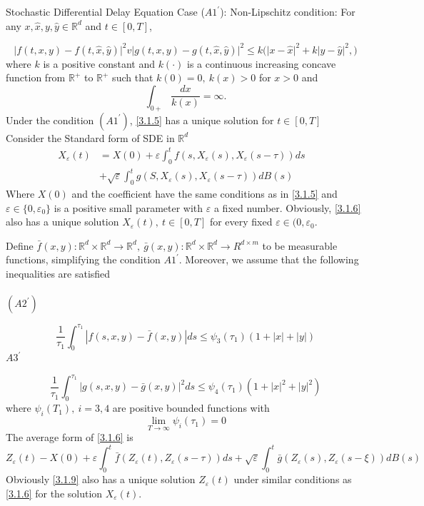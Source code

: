 \documentclass[unknownkeysallowed, compress]{beamer}
\theoremstyle{plain}
\begin{document}
\begin{frame}[allowframebreaks]{Stochastic Differential Delay Equation Case}
($A1^\prime$): Non-Lipschitz condition: For any $x,\hat{x},y,\hat{y}\in\mathbb{R}^d$ and $t\in[0,T]$,

$$
\bigg|f(t,x,y) - f(t,\hat{x},\hat{y})\bigg|^2v\bigg|g(t,x,y) - g(t,\hat{x},\hat{y})\bigg|^2\leq k\bigg(\bigg|x-\hat{x}\bigg|^2+k\bigg|y-\hat{y}\bigg|^2,\bigg)
$$
where $k$ is a positive constant and $k(\cdot)$ is a continuous increasing concave function from $\mathbb{R}^+$ to $\mathbb{R}^+$ such that $k(0) = 0, ~k(x)>0$ for $x>0$ and 
$$
\int_{0+}\frac{dx}{k(x)} = \infty.
$$
Under the condition $(A1^\prime)$, \eqref{3.1.5} has a unique solution for $t\in[0,T]$\\
Consider the Standard form of SDE in $\mathbb{R}^d$
\begin{equation}\label{3.1.6}
\begin{split}
X_\varepsilon(t) & = X(0)+\varepsilon\int_0^tf(s,X_\varepsilon(s),X_\varepsilon(s-\tau))ds&\\
&+\sqrt{\varepsilon}\int_0^tg(S,X_\varepsilon(s),X_\varepsilon(s-\tau))dB(s)
\end{split}
\end{equation}
Where $X(0)$ and the coefficient have the same conditions as in \eqref{3.1.5} and $\varepsilon\in\{0,\varepsilon_0\}$ is a positive small parameter with $\varepsilon$ a fixed number. Obviously, \eqref{3.1.6} also has a unique solution $X_\varepsilon(t),~t\in[0,T]$ for every fixed $\varepsilon\in(0,\varepsilon_0$.\\
\par Define $\bar{f}(x,y):\mathbb{R}^d\times \mathbb{R}^d\rightarrow \mathbb{R}^d,~\bar{g}(x,y):\mathbb{R}^d\times\mathbb{R}^d\rightarrow R^{d\times m}$ to be measurable functions, simplifying the condition $A1^\prime$. Moreover, we assume that the following inequalities are satisfied\\\\
$(A2^\prime)$

\begin{equation}\label{3.1.7}
\frac{1}{\tau_1}\int_0^{\tau_1}|f(s,x,y) - \bar{f}(x,y)|ds\leq \psi_3(\tau_1)(1+|x|+|y|)
\end{equation}
$A3^\prime$

\begin{equation}\label{3.1.8}
\frac{1}{\tau_1}\int_0^{\tau_1}|g(s,x,y) - \bar{g}(x,y)|^2ds\leq \psi_4(\tau_1)(1+|x|^2+|y|^2)
\end{equation}
where $\psi_i(T_1),~i = 3,4$ are positive bounded functions with 
$$
\lim_{T\rightarrow \infty}\psi_i(\tau_1)   = 0
$$
The average form of \eqref{3.1.6} is 
\begin{equation}\label{3.1.9}
Z_\varepsilon(t) - X(0)+\varepsilon\int_0^t\bar{f}(Z_\varepsilon(t),Z_\varepsilon(s-\tau))ds+\sqrt{\varepsilon}\int_0^t\bar{g}(Z_\varepsilon(s),Z_\varepsilon(s-\xi))dB(s)
\end{equation}
Obviously \eqref{3.1.9} also has a unique solution $Z_\varepsilon(t)$ under similar conditions as \eqref{3.1.6} for the solution $X_\varepsilon(t)$.
\end{frame}
\end{document}
